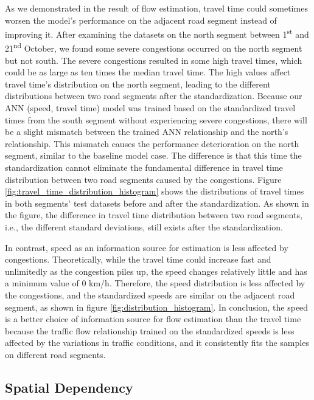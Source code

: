 \documentclass[english]{kththesis}
\begin{document}
As we demonstrated in the result of flow estimation, travel time could sometimes worsen the model's performance on the adjacent road segment instead of improving it. After examining the datasets on the north segment between 1\textsuperscript{st} and 21\textsuperscript{nd} October, we found some severe congestions occurred on the north segment but not south. The severe congestions resulted in some high travel times, which could be as large as ten times the median travel time. The high values affect travel time's distribution on the north segment, leading to the different distributions between two road segments after the standardization. Because our ANN (speed, travel time) model was trained based on the standardized travel times from the south segment without experiencing severe congestions, there will be a slight mismatch between the trained ANN relationship and the north's relationship. This mismatch causes the performance deterioration on the north segment, similar to the baseline model case.  The difference is that this time the standardization cannot eliminate the fundamental difference in travel time distribution between two road segments caused by the congestions. Figure \ref{fig:travel_time_distribution_histogram} shows the distributions of travel times in both segments' test datasets before and after the standardization. As shown in the figure, the difference in travel time distribution between two road segments, i.e., the different standard deviations, still exists after the standardization.

In contrast, speed as an information source for estimation is less affected by congestions. Theoretically, while the travel time could increase fast and unlimitedly as the congestion piles up, the speed changes relatively little and has a minimum value of 0 km/h. Therefore, the speed distribution is less affected by the congestions, and the standardized speeds are similar on the adjacent road segment, as shown in figure \ref{fig:distribution_histogram}. In conclusion, the speed is a better choice of information source for flow estimation than the travel time because the traffic flow relationship trained on the standardized speeds is less affected by the variations in traffic conditions, and it consistently fits the samples on different road segments.

\subsection{Spatial Dependency}
\label{subsec:discussionSpatialDependency}
\end{document}
